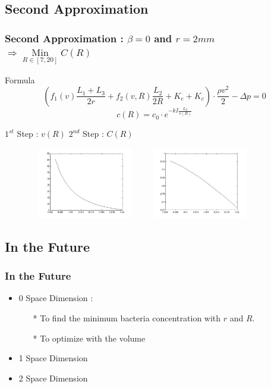 \documentclass[xcolor=dvipsnames,10pt]{beamer}
\begin{document}
  \subsection{Second Approximation}
  \begin{frame}
  \frametitle{Second Approximation : $\beta = 0$ and $r=2mm$ $\Rightarrow \mathop{Min}\limits _{R\in [7,20]} C(R)$}
  \begin{block}{Formula}
  \begin{equation}
  \left(f_1(v)\frac{L_1+L_3}{2r} + f_2(v,R)\frac{L_2}{2R} + K_e + K_c\right)\cdot \frac{\rho v^2}{2} - \Delta p = 0
  \end{equation}
  \begin{equation}
  c(R) = c_0\cdot e^{-kI\frac{L_2}{v(R)}}
  \end{equation}
  \end{block}
  $1^{st}$ Step : $v(R)$ \hspace{40mm} $2^{nd}$ Step : $C(R)$
          \begin{figure}
          \raggedleft
          \includegraphics[height=3.1cm, width=5cm]{./images/graphVR.jpg}
          \hspace{5mm}
          \raggedright
          \includegraphics[height=3.1cm, width=5cm]{./images/graphCR.jpg}
          \end{figure}
  \end{frame}

  \subsection{In the Future}
  \begin{frame}
  \frametitle{In the Future}
  \begin{itemize}
  \item 0 Space Dimension :
          \begin{itemize} 
                  \item[*] To find the minimum bacteria concentration with $r$ and $R$.
                  \item[*] To optimize with the volume
          \end{itemize}
  \vspace{1cm}
  \item 1 Space Dimension
  \vspace{1cm}
  \item 2 Space Dimension

  \end{itemize}
  \end{frame}
\end{document}
